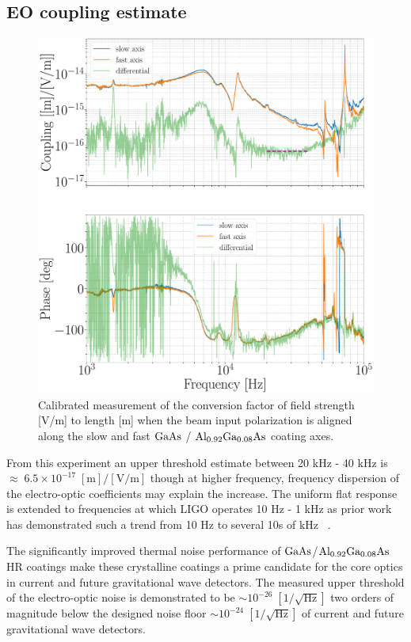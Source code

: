 \subsection{EO coupling estimate}

\begin{figure}[H]
    \centering
    \includegraphics[width=.91\textwidth]{figs/ALGAAS/coupling_tf.pdf}
    \caption{Calibrated measurement of the conversion factor of field strength [V/m] to length [m] when the beam input polarization is aligned along the slow and fast $\mathrm{GaAs}$ / $\mathrm{Al_{0.92}Ga_{0.08}As}$ coating axes.}
    \label{fig:final_tf_conversion}
\end{figure}


From this experiment an upper threshold estimate between 20 kHz - 40 kHz is $\approx \; 6.5 \times 10^{-17} \; [\mathrm{m}]/[\mathrm{V}/\mathrm{m}]$ though at higher frequency, frequency dispersion of the electro-optic coefficients may explain the increase.  The uniform flat response is extended to frequencies at which LIGO operates 10 Hz - 1 kHz as prior work has demonstrated such a trend from 10 Hz to several 10s of kHz ~\cite{salvestrini:2003}.

The significantly improved thermal noise performance of $\mathrm{GaAs}$/$\mathrm{Al_{0.92}Ga_{0.08}As}$ HR coatings make these crystalline coatings a prime candidate for the core optics in current and future gravitational wave detectors. The measured upper threshold of the electro-optic noise is demonstrated to be $\sim 10^{-26} \; [1/\sqrt{\mathrm{Hz}}]$ two orders of magnitude below the designed noise floor $\sim 10^{-24}\; [1/\sqrt{\mathrm{Hz}}]$ of current and future gravitational wave detectors.

\fi

